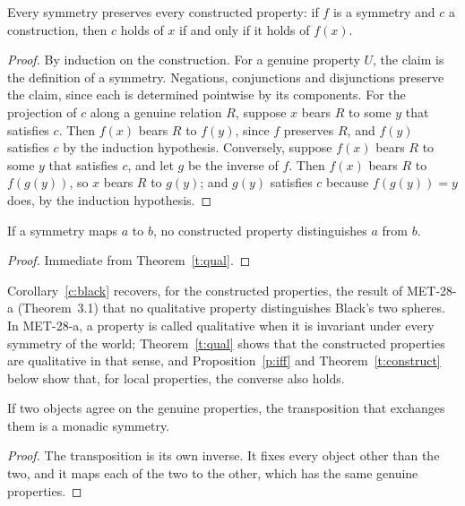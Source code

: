 \documentclass{situationist-preprint}
\begin{document}
\begin{theorem}[Qualitativeness]\label{t:qual}
Every symmetry preserves every constructed property: if $f$ is a symmetry and $c$ a construction, then $c$ holds of $x$ if and only if it holds of $f(x)$.
\end{theorem}

\begin{proof}
By induction on the construction. For a genuine property $U$, the claim is the definition of a symmetry. Negations, conjunctions and disjunctions preserve the claim, since each is determined pointwise by its components. For the projection of $c$ along a genuine relation $R$, suppose $x$ bears $R$ to some $y$ that satisfies $c$. Then $f(x)$ bears $R$ to $f(y)$, since $f$ preserves $R$, and $f(y)$ satisfies $c$ by the induction hypothesis. Conversely, suppose $f(x)$ bears $R$ to some $y$ that satisfies $c$, and let $g$ be the inverse of $f$. Then $f(x)$ bears $R$ to $f(g(y))$, so $x$ bears $R$ to $g(y)$; and $g(y)$ satisfies $c$ because $f(g(y)) = y$ does, by the induction hypothesis.
\end{proof}

\begin{corollary}\label{c:black}
If a symmetry maps $a$ to $b$, no constructed property distinguishes $a$ from $b$.
\end{corollary}

\begin{proof}
Immediate from Theorem~\ref{t:qual}.
\end{proof}

Corollary~\ref{c:black} recovers, for the constructed properties, the result of MET-28-a (Theorem~3.1) that no qualitative property distinguishes Black's two spheres. In MET-28-a, a property is called qualitative when it is invariant under every symmetry of the world; Theorem~\ref{t:qual} shows that the constructed properties are qualitative in that sense, and Proposition~\ref{p:iff} and Theorem~\ref{t:construct} below show that, for local properties, the converse also holds.

\begin{lemma}\label{l:swapmono}
If two objects agree on the genuine properties, the transposition that exchanges them is a monadic symmetry.
\end{lemma}

\begin{proof}
The transposition is its own inverse. It fixes every object other than the two, and it maps each of the two to the other, which has the same genuine properties.
\end{proof}
\end{document}
